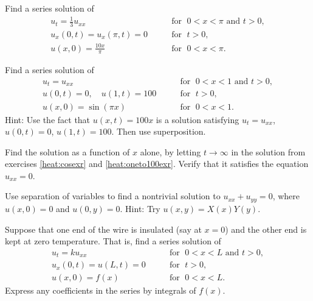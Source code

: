 \begin{exercise} \label{heat:cosexr}
Find a series solution of
\begin{equation*}
\begin{array}{ll}
u_t = \frac{1}{3} u_{xx} & \qquad \text{for } \; 0 < x < \pi \text{ and } t > 0, \\
u_x(0,t) = u_x(\pi,t) = 0 & \qquad \text{for } \; t > 0, \\
u(x,0) = \frac{10x}{\pi} & \qquad \text{for } \; 0 < x < \pi .
\end{array}
\end{equation*}
\end{exercise}

\begin{exercise} \label{heat:oneto100exr}
Find a series solution of
\begin{equation*}
\begin{array}{ll}
u_t =  u_{xx} & \qquad \text{for } \; 0 < x < 1 \text{ and } t > 0, \\
u(0,t) = 0 , \quad u(1,t) = 100 & \qquad \text{for } \; t > 0, \\
u(x,0) = \sin (\pi x) & \qquad \text{for } \; 0 < x < 1 .
\end{array}
\end{equation*}
Hint: Use the fact that $u(x,t) = 100 x$ is a solution satisfying
$u_t = u_{xx}$, $u(0,t) = 0$, $u(1,t) = 100$.  Then use superposition.
\end{exercise}

\begin{exercise}
Find the \emph{} solution as a function
of $x$ alone,
by letting $t \to
\infty$ in the solution from
exercises \ref{heat:cosexr} and \ref{heat:oneto100exr}.
Verify that it satisfies the equation $u_{xx} = 0$.
\end{exercise}

\begin{exercise}
Use separation of variables to find a nontrivial
solution to $u_{xx} + u_{yy} = 0$, where $u(x,0) = 0$ and $u(0,y) = 0$.
Hint: Try $u(x,y) = X(x)Y(y)$.
\end{exercise}

\begin{exercise}[challenging]
Suppose that one end of the wire is insulated (say at $x=0$) and
the other end is kept at zero temperature.  That is,
find a series solution of
\begin{equation*}
\begin{array}{ll}
u_t = k u_{xx} & \qquad \text{for } \; 0 < x < L \text{ and } t > 0, \\
u_x(0,t) = u(L,t) = 0  & \qquad \text{for } \; t > 0, \\
u(x,0) = f(x) & \qquad \text{for } \; 0 < x < L .
\end{array}
\end{equation*}
Express any coefficients in the series by integrals of $f(x)$.
\end{exercise}

